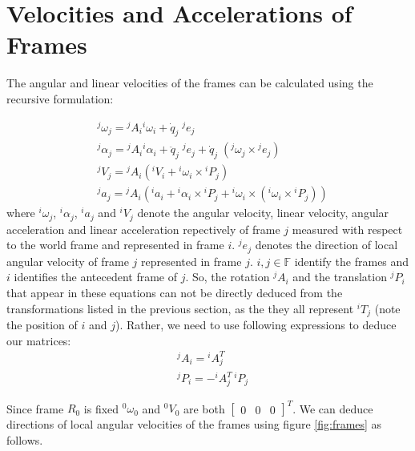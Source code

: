 \documentclass[a4paper,10pt]{article}
\begin{document}
\section{Velocities and Accelerations of Frames}
The angular and linear velocities of the frames can be calculated using the recursive formulation:

\begin{align}
 &{}^j\omega_j={}^jA_i{}^i\omega_i+\dot{q}_j\;{}^je_j \label{recursiveAngVel}\\
 &{}^j\alpha_j={}^jA_i{}^i\alpha_i+\ddot{q}_j\;{}^je_j+\dot{q}_j\;({}^j\omega_j \times {}^je_j) \label{recursiveAngAcc}\\
 &{}^jV_j={}^jA_i\left({}^iV_i+{}^i\omega_i \times {}^iP_j\right) \label{recursiveLinVel}\\
 &{}^ja_j={}^jA_i\left({}^ia_i+{}^i\alpha_i \times {}^iP_j + {}^i\omega_i \times ({}^i\omega_i \times {}^iP_j)\right) \label{recursiveLinAcc}
\end{align} where ${}^i\omega_j$, ${}^i\alpha_j$, ${}^ia_j$ and ${}^iV_j$ denote the angular velocity, linear velocity, 
angular acceleration and linear acceleration repectively of frame $j$ measured with respect to the 
world frame and represented in frame $i$. ${}^je_j$ denotes the direction of local angular velocity of frame $j$ represented in frame $j$. 
$i, j \in \mathbb{F}$ identify the frames and $i$ identifies the antecedent frame of $j$. So, the rotation ${}^jA_i$ and the 
translation ${}^jP_i$ that appear in these equations can not be directly deduced from the transformations listed in the previous section, 
as the they all represent ${}^iT_j$ (note the position of $i$ and $j$). Rather, we need to use following expressions to deduce our matrices:
\begin{align}
 &{}^jA_i = {}^iA_j^T \nonumber \\ 
 &{}^jP_i = -{}^iA_j^T\,{}^iP_j \nonumber
\end{align}

Since frame $R_0$ is fixed ${}^0\omega_0$ and ${}^0V_0$ are both $\left[\begin{matrix}0 & 0 & 0\end{matrix}\right]^T$. We can deduce directions of 
local angular velocities of the frames using figure \ref{fig:frames} as follows.
\end{document}
